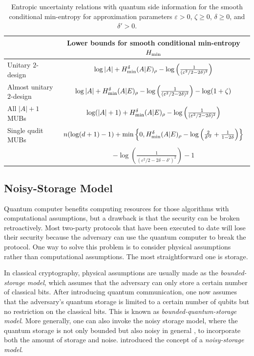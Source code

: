 \begin{table}[h]
    \centering
    \begin{tabular}{|l|c|}
        \hline
         & Lower bounds for smooth conditional min-entropy $H_{{\min}}$ \\
        \hline 
        Unitary $2$-design & $\log |A| + H_{{\min}}^{\delta}(A | E)_{\rho} - \log\left(\frac{1}{(\varepsilon^{2} / 2 - 2 \delta)^{2}}\right)$ \\
        \hline
        Almost unitary $2$-design & $\log |A| + H_{{\min}}^{\delta}(A | E)_{\rho} - \log\left(\frac{1}{(\varepsilon^{2} / 2 - 2 \delta)^{2}}\right) - \log(1 + \zeta)$ \\
        \hline
        All $|A| + 1$ MUBs & $\log(|A| + 1) + H_{{\min}}^{\delta}(A | E)_{\rho} - \log\left(\frac{1}{(\varepsilon^{2} / 2 - 2 \delta)^{2}}\right)$ \\
        \hline
        Single qudit MUBs & $n (\log(d + 1) - 1) + \min\left\{0, H_{{\min}}^{\delta}(A | E)_{\rho} - \log\left(\frac{2}{\delta'^{2}} + \frac{1}{1 - 2 \delta}\right)\right\}$ \\
        & \hfill $ - \log\left(\frac{1}{(\varepsilon^{2} / 2 - 2 \delta - \delta')^{2}}\right) - 1$\\
        \hline
    \end{tabular}
    \vspace{5pt}
    \caption{Entropic uncertainty relations with quantum side information for the smooth conditional min-entropy for approximation parameters $\varepsilon > 0$, $\zeta \ge 0$, $\delta \ge 0$, and $\delta' > 0$.}
    \label{tab:lower_bounds}
\end{table}

\subsection{Noisy-Storage Model}

Quantum computer benefits computing resources for those algorithms with computational assumptions, but a drawback is that the security can be broken retroactively. Most two-party protocols that have been executed to date will lose their security because the adversary can use the quantum computer to break the protocol. One way to solve this problem is to consider physical assumptions rather than computational assumptions. The most straightforward one is storage. 

In classical cryptography, physical assumptions are usually made as the \emph{bounded-storage model}, which assumes that the adversary can only store a certain number of classical bits. After introducing quantum communication, one now assumes that the adversary's quantum storage is limited to a certain number of qubits but no restriction on the classical bits. This is known as \emph{bounded-quantum-storage model}. More generally, one can also invoke the noisy storage model, where the quantum storage is not only bounded but also noisy in general \cite{tudelftQC}, to incorporate both the amount of storage and noise. \cite{Konig_2012} introduced the concept of a \emph{noisy-storage model}.

